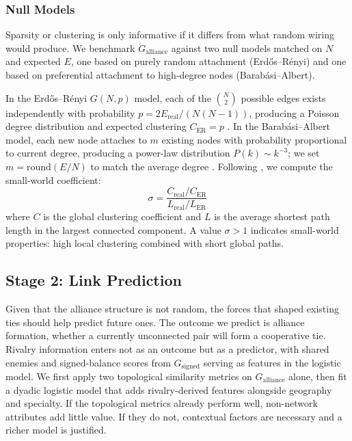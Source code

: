 \documentclass[11pt, a4paper]{article}
\begin{document}
\subsubsection{Null Models}\label{sec:null_models}

Sparsity or clustering is only informative if it differs from what random wiring would produce. We benchmark $G_{\text{alliance}}$ against two null models matched on $N$ and expected $E$, one based on purely random attachment (Erd\H{o}s--R\'enyi) and one based on preferential attachment to high-degree nodes (Barab\'asi--Albert).

In the Erd\H{o}s--R\'enyi $G(N,p)$ model, each of the $\binom{N}{2}$ possible edges exists independently with probability $p = 2E_{\text{real}} / (N(N-1))$, producing a Poisson degree distribution and expected clustering $C_{\text{ER}} = p$ \citep{erdos1959random}. In the Barab\'asi--Albert model, each new node attaches to $m$ existing nodes with probability proportional to current degree, producing a power-law distribution $P(k) \sim k^{-3}$; we set $m = \text{round}(E/N)$ to match the average degree \citep{barabasi1999emergence}. Following \citet{watts1998collective}, we compute the small-world coefficient:
\begin{equation}\label{eq:smallworld}
    \sigma = \frac{C_{\text{real}} / C_{\text{ER}}}{L_{\text{real}} / L_{\text{ER}}}
\end{equation}
where $C$ is the global clustering coefficient and $L$ is the average shortest path length in the largest connected component. A value $\sigma > 1$ indicates small-world properties: high local clustering combined with short global paths.

\subsection{Stage 2: Link Prediction}\label{sec:stage2_methods}

Given that the alliance structure is not random, the forces that shaped existing ties should help predict future ones. The outcome we predict is alliance formation, whether a currently unconnected pair will form a cooperative tie. Rivalry information enters not as an outcome but as a predictor, with shared enemies and signed-balance scores from $G_{\text{signed}}$ serving as features in the logistic model. We first apply two topological similarity metrics on $G_{\text{alliance}}$ alone, then fit a dyadic logistic model that adds rivalry-derived features alongside geography and specialty. If the topological metrics already perform well, non-network attributes add little value. If they do not, contextual factors are necessary and a richer model is justified.
\end{document}
